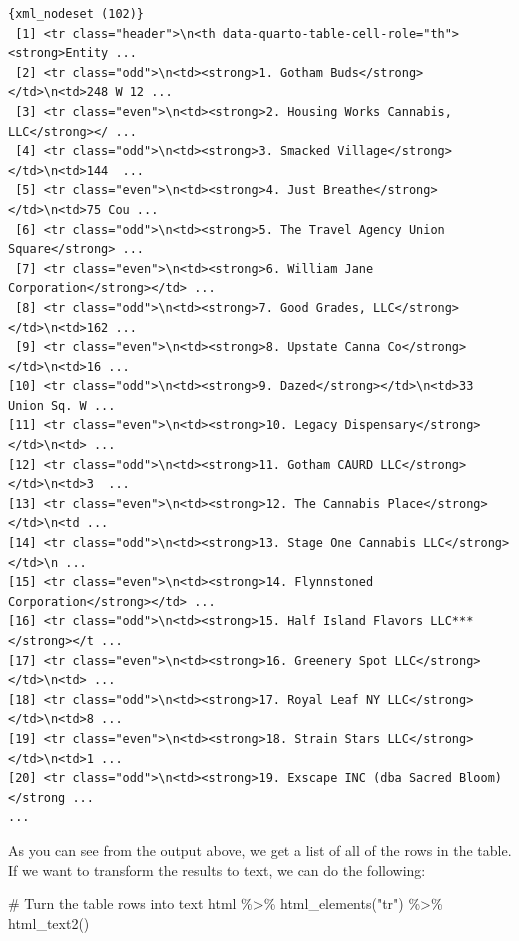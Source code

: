 \documentclass[
  letterpaper,
]{book}
\newenvironment{Shaded}{\begin{snugshade}}{\end{snugshade}}
\newcommand{\CommentTok}[1]{\textcolor[rgb]{0.37,0.37,0.37}{#1}}
\newcommand{\FunctionTok}[1]{\textcolor[rgb]{0.28,0.35,0.67}{#1}}
\newcommand{\NormalTok}[1]{\textcolor[rgb]{0.00,0.23,0.31}{#1}}
\newcommand{\SpecialCharTok}[1]{\textcolor[rgb]{0.37,0.37,0.37}{#1}}
\newcommand{\StringTok}[1]{\textcolor[rgb]{0.13,0.47,0.30}{#1}}
\begin{document}
\begin{verbatim}
{xml_nodeset (102)}
 [1] <tr class="header">\n<th data-quarto-table-cell-role="th"><strong>Entity ...
 [2] <tr class="odd">\n<td><strong>1. Gotham Buds</strong></td>\n<td>248 W 12 ...
 [3] <tr class="even">\n<td><strong>2. Housing Works Cannabis, LLC</strong></ ...
 [4] <tr class="odd">\n<td><strong>3. Smacked Village</strong></td>\n<td>144  ...
 [5] <tr class="even">\n<td><strong>4. Just Breathe</strong></td>\n<td>75 Cou ...
 [6] <tr class="odd">\n<td><strong>5. The Travel Agency Union Square</strong> ...
 [7] <tr class="even">\n<td><strong>6. William Jane Corporation</strong></td> ...
 [8] <tr class="odd">\n<td><strong>7. Good Grades, LLC</strong></td>\n<td>162 ...
 [9] <tr class="even">\n<td><strong>8. Upstate Canna Co</strong></td>\n<td>16 ...
[10] <tr class="odd">\n<td><strong>9. Dazed</strong></td>\n<td>33 Union Sq. W ...
[11] <tr class="even">\n<td><strong>10. Legacy Dispensary</strong></td>\n<td> ...
[12] <tr class="odd">\n<td><strong>11. Gotham CAURD LLC</strong></td>\n<td>3  ...
[13] <tr class="even">\n<td><strong>12. The Cannabis Place</strong></td>\n<td ...
[14] <tr class="odd">\n<td><strong>13. Stage One Cannabis LLC</strong></td>\n ...
[15] <tr class="even">\n<td><strong>14. Flynnstoned Corporation</strong></td> ...
[16] <tr class="odd">\n<td><strong>15. Half Island Flavors LLC***</strong></t ...
[17] <tr class="even">\n<td><strong>16. Greenery Spot LLC</strong></td>\n<td> ...
[18] <tr class="odd">\n<td><strong>17. Royal Leaf NY LLC</strong></td>\n<td>8 ...
[19] <tr class="even">\n<td><strong>18. Strain Stars LLC</strong></td>\n<td>1 ...
[20] <tr class="odd">\n<td><strong>19. Exscape INC (dba Sacred Bloom)</strong ...
...
\end{verbatim}

As you can see from the output above, we get a list of all of the rows
in the table. If we want to transform the results to text, we can do the
following:

\begin{Shaded}
\begin{Highlighting}[]
\CommentTok{\# Turn the table rows into text}
\NormalTok{html }\SpecialCharTok{\%\textgreater{}\%}
  \FunctionTok{html\_elements}\NormalTok{(}\StringTok{"tr"}\NormalTok{) }\SpecialCharTok{\%\textgreater{}\%}
  \FunctionTok{html\_text2}\NormalTok{()}
\end{Highlighting}
\end{Shaded}
\end{document}
